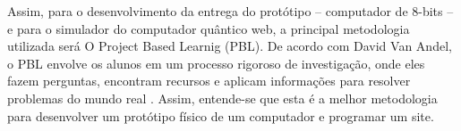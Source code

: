 Assim, para o desenvolvimento da entrega do protótipo – computador de 8-bits – e para o simulador do computador quântico web, a principal metodologia utilizada será O Project Based Learnig (PBL). De acordo com  David Van Andel, o PBL envolve os alunos em um processo rigoroso de investigação, onde eles fazem perguntas, encontram recursos e aplicam informações para resolver problemas do mundo real \cite{3}. Assim, entende-se que esta é a melhor metodologia para desenvolver um protótipo físico de um computador e programar um site.

\newpage